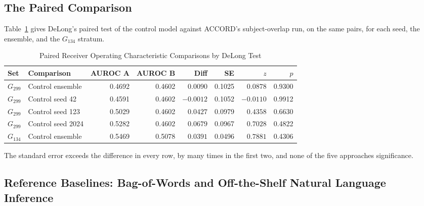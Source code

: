 \subsection{The Paired Comparison}

Table~\ref{tab:delong} gives DeLong's paired test of the control model against ACCORD's
subject-overlap run, on the same pairs, for each seed, the ensemble, and the $G_{134}$ stratum.


\begin{table}[!htbp]
\caption{Paired Receiver Operating Characteristic Comparisons by DeLong Test}
\centering
\small
\setlength{\tabcolsep}{4pt}
\begin{tabular}{llrrrrrr}
\toprule
\textbf{Set} & \textbf{Comparison} & \textbf{AUROC A} & \textbf{AUROC B} &
\textbf{Diff} & \textbf{SE} & \textbf{$z$} & \textbf{$p$} \\
\midrule
$G_{299}$ & Control ensemble  & 0.4692 & 0.4602 & $0.0090$  & 0.1025 & $0.0878$  & 0.9300 \\
$G_{299}$ & Control seed 42  & 0.4591 & 0.4602 & $-0.0012$ & 0.1052 & $-0.0110$ & 0.9912 \\
$G_{299}$ & Control seed 123  & 0.5029 & 0.4602 & $0.0427$  & 0.0979 & $0.4358$  & 0.6630 \\
$G_{299}$ & Control seed 2024 & 0.5282 & 0.4602 & $0.0679$  & 0.0967 & $0.7028$  & 0.4822 \\
$G_{134}$ & Control ensemble  & 0.5469 & 0.5078 & $0.0391$  & 0.0496 & $0.7881$  & 0.4306 \\
\bottomrule
\end{tabular}
\label{tab:delong}
\end{table}

The standard error exceeds the difference in every row, by many times in the first two, and
none of the five approaches significance.

\subsection{Reference Baselines: Bag-of-Words and Off-the-Shelf Natural Language Inference}

